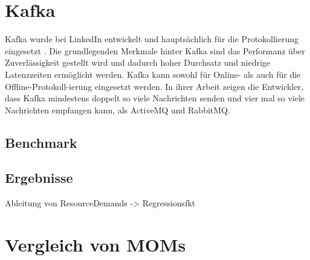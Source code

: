 \section{Kafka}
Kafka wurde bei LinkedIn entwickelt und hauptsächlich für die Protokollierung eingesetzt \cite{kafka}. Die grundlegenden Merkmale hinter Kafka sind das Performanz über Zuverlässigkeit gestellt wird und dadurch hoher Durchsatz und niedrige Latenzzeiten ermöglicht werden. Kafka kann sowohl für Online- als auch für die Offline-Protokoll-ierung eingesetzt werden. In ihrer Arbeit zeigen die Entwickler, dass Kafka mindestens doppelt so viele Nachrichten senden und vier mal so viele Nachrichten empfangen kann, als ActiveMQ und RabbitMQ.
\subsection{Benchmark}
\subsection{Ergebnisse}
Ableitung von ResourceDemands -> Regressionsfkt

\section{Vergleich von MOMs}


